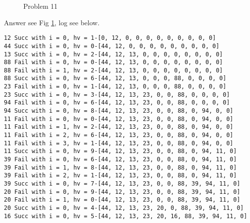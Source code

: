 \documentclass[11pt,largemargins]{homework}
\begin{document}
\question
\begin{figure}[h!]

\centering
{}
\caption{Problem 11}
\label{hs11}
\end{figure}
Answer see Fig \ref{hs11}, log see below.

\begin{lstlisting}
12 Succ with i = 0, hv = 1-[0, 12, 0, 0, 0, 0, 0, 0, 0, 0, 0]
44 Succ with i = 0, hv = 0-[44, 12, 0, 0, 0, 0, 0, 0, 0, 0, 0]
13 Succ with i = 0, hv = 2-[44, 12, 13, 0, 0, 0, 0, 0, 0, 0, 0]
88 Fail with i = 0, hv = 0-[44, 12, 13, 0, 0, 0, 0, 0, 0, 0, 0]
88 Fail with i = 1, hv = 2-[44, 12, 13, 0, 0, 0, 0, 0, 0, 0, 0]
88 Succ with i = 0, hv = 6-[44, 12, 13, 0, 0, 0, 88, 0, 0, 0, 0]
23 Fail with i = 0, hv = 1-[44, 12, 13, 0, 0, 0, 88, 0, 0, 0, 0]
23 Succ with i = 0, hv = 3-[44, 12, 13, 23, 0, 0, 88, 0, 0, 0, 0]
94 Fail with i = 0, hv = 6-[44, 12, 13, 23, 0, 0, 88, 0, 0, 0, 0]
94 Succ with i = 0, hv = 8-[44, 12, 13, 23, 0, 0, 88, 0, 94, 0, 0]
11 Fail with i = 0, hv = 0-[44, 12, 13, 23, 0, 0, 88, 0, 94, 0, 0]
11 Fail with i = 1, hv = 2-[44, 12, 13, 23, 0, 0, 88, 0, 94, 0, 0]
11 Fail with i = 2, hv = 6-[44, 12, 13, 23, 0, 0, 88, 0, 94, 0, 0]
11 Fail with i = 3, hv = 1-[44, 12, 13, 23, 0, 0, 88, 0, 94, 0, 0]
11 Succ with i = 0, hv = 9-[44, 12, 13, 23, 0, 0, 88, 0, 94, 11, 0]
39 Fail with i = 0, hv = 6-[44, 12, 13, 23, 0, 0, 88, 0, 94, 11, 0]
39 Fail with i = 1, hv = 8-[44, 12, 13, 23, 0, 0, 88, 0, 94, 11, 0]
39 Fail with i = 2, hv = 1-[44, 12, 13, 23, 0, 0, 88, 0, 94, 11, 0]
39 Succ with i = 0, hv = 7-[44, 12, 13, 23, 0, 0, 88, 39, 94, 11, 0]
20 Fail with i = 0, hv = 9-[44, 12, 13, 23, 0, 0, 88, 39, 94, 11, 0]
20 Fail with i = 1, hv = 0-[44, 12, 13, 23, 0, 0, 88, 39, 94, 11, 0]
20 Succ with i = 0, hv = 4-[44, 12, 13, 23, 20, 0, 88, 39, 94, 11, 0]
16 Succ with i = 0, hv = 5-[44, 12, 13, 23, 20, 16, 88, 39, 94, 11, 0]
\end{lstlisting}
\end{document}
